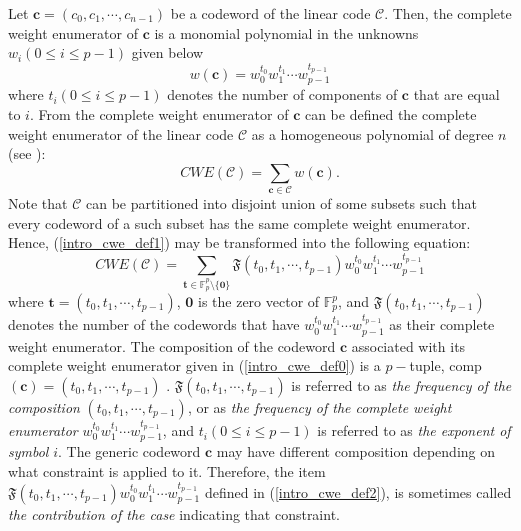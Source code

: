 \documentclass[final,1p,times]{elsarticle}
\begin{document}
Let $ \mathbf{c}=(c_{0},c_{1},\cdots,c_{n-1})$ be a codeword of the linear code $\mathcal{C}  $. Then, the complete weight enumerator of $ \mathbf{c} $ is a monomial polynomial in the unknowns $ w_{i} (0\leq i\leq p-1)$ given below
\begin{equation}\label{intro_cwe_def0}
w(\mathbf{c})=w_{0}^{t_{0}}w_{1}^{t_{1}}\cdots w_{p-1}^{t_{p-1}}
\end{equation}
where $ t_{i}(0\leq i\leq p-1) $ denotes the number of components of $ \mathbf{c} $ that are equal to $ i $. From the complete weight enumerator of $ \mathbf{c} $ can be defined the complete weight enumerator of the linear code $\mathcal{C}  $ as a homogeneous polynomial of degree $ n $ (see \cite{Bib18,Bib19}):
\begin{equation}\label{intro_cwe_def1}
\mathit{CWE}(\mathcal{C})=\sum_{\mathbf{c}\in\mathcal{C}}w(\mathbf{c}).
\end{equation}
Note that  $ \mathcal{C} $ can be partitioned into disjoint union of some subsets such that every codeword of a such subset has the same complete weight enumerator. Hence, (\ref{intro_cwe_def1}) may be transformed into the following equation:
\begin{equation}\label{intro_cwe_def2}
\mathit{CWE}(\mathcal{C})=\sum\limits_{\mathbf{t}\in \mathbb{F}_{p}^{p}\setminus \lbrace \mathbf{0}\rbrace }\mathfrak{F}(t_{0},t_{1},\cdots,t_{p-1})w_{0}^{t_{0}}w_{1}^{t_{1}}\cdots w_{p-1}^{t_{p-1}}
\end{equation}
where $ \mathbf{t}=(t_{0},t_{1},\cdots,t_{p-1})$, $ \mathbf{0} $ is the zero vector of $ \mathbb{F}_{p}^{p} $, and $ \mathfrak{F}(t_{0},t_{1},\cdots,t_{p-1}) $ denotes the number of the codewords that have $ w_{0}^{t_{0}}w_{1}^{t_{1}}\cdots w_{p-1}^{t_{p-1}}  $ as their complete weight enumerator. The composition of the codeword $  \mathbf{c}$ associated with its complete weight enumerator given in (\ref{intro_cwe_def0}) is a $ p- $tuple,  comp$(\mathbf{c}) =(t_{0},t_{1},\cdots,t_{p-1})$ \cite{Bib18}. $ \mathfrak{F}(t_{0},t_{1},\cdots,t_{p-1}) $ is referred to as \textit{the frequency of the composition} $ (t_{0},t_{1},\cdots,t_{p-1}) $, or as \textit{the frequency of the complete weight enumerator} $ w_{0}^{t_{0}}w_{1}^{t_{1}}\cdots w_{p-1}^{t_{p-1}} $, and $ t_{i}(0\leq i\leq p-1) $ is referred to as \textit{the exponent of symbol} $ i $. The generic codeword $ \mathbf{c} $ may have different composition depending on what constraint is applied to it. Therefore, the item $ \mathfrak{F}(t_{0},t_{1},\cdots,t_{p-1})w_{0}^{t_{0}}w_{1}^{t_{1}}\cdots w_{p-1}^{t_{p-1}} $ defined in (\ref{intro_cwe_def2}), is sometimes called \textit{the contribution of the case} indicating that constraint.
\end{document}
